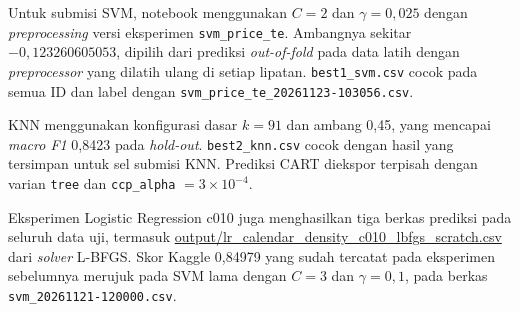 Untuk submisi SVM, notebook menggunakan $C=2$ dan $\gamma=0{,}025$ dengan
\textit{preprocessing} versi eksperimen \texttt{svm\_price\_te}. Ambangnya
sekitar $-0{,}123260605053$, dipilih dari prediksi \textit{out-of-fold}
pada data latih dengan \textit{preprocessor} yang dilatih ulang di setiap
lipatan. \texttt{best1\_svm.csv} cocok pada semua ID dan label dengan
\texttt{svm\_price\_te\_20261123-103056.csv}.

KNN menggunakan konfigurasi dasar $k=91$ dan ambang 0,45,
yang mencapai \textit{macro F1} 0,8423 pada \textit{hold-out}.
\texttt{best2\_knn.csv} cocok dengan hasil yang tersimpan untuk sel submisi
KNN. Prediksi CART diekspor terpisah dengan varian \texttt{tree} dan
\texttt{ccp\_alpha} $=3\times10^{-4}$.

Eksperimen Logistic Regression c010 juga menghasilkan tiga berkas
prediksi pada seluruh data uji, termasuk
\url{output/lr_calendar_density_c010_lbfgs_scratch.csv}
dari \textit{solver} L-BFGS. Skor Kaggle 0,84979 yang sudah tercatat pada
eksperimen sebelumnya merujuk pada SVM lama dengan $C=3$ dan
$\gamma=0{,}1$, pada berkas \texttt{svm\_20261121-120000.csv}.
